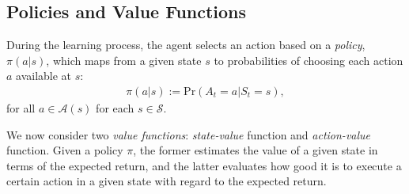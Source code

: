 \subsection{Policies and Value Functions}
\label{subsection:policies and value functions}
During the learning process, the agent selects an action based on a \textit{policy}, $\pi(a|s)$, which maps from a given state $s$ to probabilities of choosing each action $a$ available at $s$:
\begin{align}
    \pi(a|s) := \text{Pr}(A_t=a|S_t=s),
\end{align}
for all $a\in\mathcal{A}(s)$ for each $s\in\mathcal{S}$.

We now consider two \textit{value functions}: \textit{state-value} function and \textit{action-value} function. Given a policy $\pi$, the former estimates the value of a given state in terms of the expected return, and the latter evaluates how good it is to execute a certain action in a given state with regard to the expected return. 

